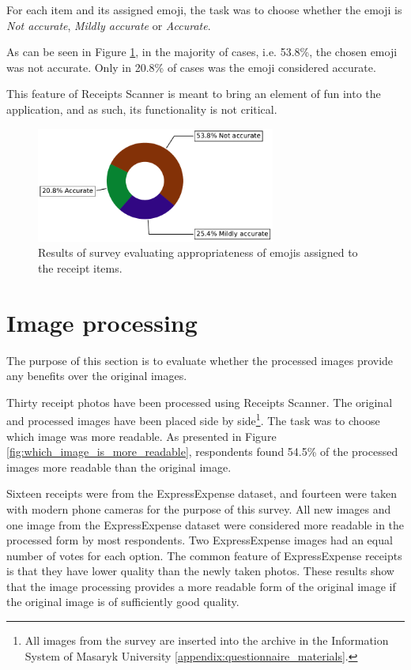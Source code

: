 \documentclass[
  digital, %
  table,   %
  oneside, %
  lof,     %
  lot,     %
]{fithesis3}
\begin{document}
For each item and its assigned emoji, the task was to choose whether the emoji is \textit{Not accurate}, \textit{Mildly accurate} or \textit{Accurate}.

As can be seen in Figure \ref{fig:quality_of_emojis}, in the majority of cases, i.e. 53.8\%, the chosen emoji was not accurate. Only in 20.8\% of cases was the emoji considered accurate.

This feature of Receipts Scanner is meant to bring an element of fun into the application, and as such, its functionality is not critical. 

\begin{figure}
    \begin{center}
        \includegraphics[width=0.7\textwidth]{figures/graphs/quality_of_emojis}
    \end{center}
    \caption{Results of survey evaluating appropriateness of emojis assigned to the receipt items.}
    \label{fig:quality_of_emojis}
\end{figure}

\section{Image processing}
The purpose of this section is to evaluate whether the processed images provide any benefits over the original images.

Thirty receipt photos have been processed using Receipts Scanner. The original and processed images have been placed side by side\footnote{All images from the survey are inserted into the archive in the Information System of Masaryk University \ref{appendix:questionnaire_materials}.}. The task was to choose which image was more readable. As presented in Figure \ref{fig:which_image_is_more_readable}, respondents found 54.5\% of the processed images more readable than the original image.

Sixteen receipts were from the ExpressExpense \cite{ExpressExpense2019Receipt} dataset, and fourteen were taken with modern phone cameras for the purpose of this survey.
All new images and one image from the ExpressExpense dataset were considered more readable in the processed form by most respondents. Two ExpressExpense images had an equal number of votes for each option. The common feature of ExpressExpense receipts is that they have lower quality than the newly taken photos. These results show that the image processing provides a more readable form of the original image if the original image is of sufficiently good quality.
\end{document}
